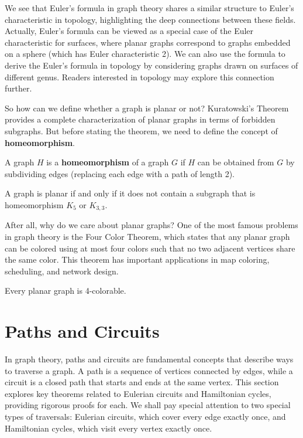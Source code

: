 We see that Euler's formula in graph theory shares a similar structure to Euler's characteristic in topology, highlighting the deep connections between these fields. Actually, Euler's formula can be viewed as a special case of the Euler characteristic for surfaces, where planar graphs correspond to graphs embedded on a sphere (which has Euler characteristic 2). We can also use the formula to derive the Euler's formula in topology by considering graphs drawn on surfaces of different genus. Readers interested in topology may explore this connection further.

So how can we define whether a graph is planar or not? Kuratowski's Theorem provides a complete characterization of planar graphs in terms of forbidden subgraphs. But before stating the theorem, we need to define the concept of \textbf{homeomorphism}.

\begin{definition}
A graph $H$ is a \textbf{homeomorphism} of a graph $G$ if $H$ can be obtained from $G$ by subdividing edges (replacing each edge with a path of length 2).
\end{definition}

\begin{theorem}
A graph is planar if and only if it does not contain a subgraph that is homeomorphism $K_5$ or $K_{3,3}$.
\end{theorem}

After all, why do we care about planar graphs? One of the most famous problems in graph theory is the Four Color Theorem, which states that any planar graph can be colored using at most four colors such that no two adjacent vertices share the same color. This theorem has important applications in map coloring, scheduling, and network design.

\begin{theorem}
Every planar graph is 4-colorable.
\end{theorem}

\section{Paths and Circuits}

In graph theory, paths and circuits are fundamental concepts that describe ways to traverse a graph. A path is a sequence of vertices connected by edges, while a circuit is a closed path that starts and ends at the same vertex. This section explores key theorems related to Eulerian circuits and Hamiltonian cycles, providing rigorous proofs for each. We shall pay special attention to two special types of traversals: Eulerian circuits, which cover every edge exactly once, and Hamiltonian cycles, which visit every vertex exactly once.

